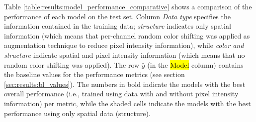 
\glsresetall
\graphicspath{{./Sections/Results/Resources/}}

Table \ref{table:results:model_performance_comparative} shows a comparison of the performance of each model on the test set. Column \textit{Data type} specifies the information contained in the training data; \textit{structure} indicates only spatial information (which means that per-channel random color shifting was applied as augmentation technique to reduce pixel intensity information), while \textit{color and structure} indicate spatial and pixel intensity information (which means that no random color shifting was applied). The row $\bar{y}$ (in the \hl{Model} column) contains the baseline values for the performance metrics (see section \ref{sec:results:bl_values}). The numbers in bold indicate the models with the best overall performance (i.e., trained using data with and without pixel intensity information) per metric, while the shaded cells indicate the models with the best performance using only spatial data (structure).

\setlength{\mylinewidth}{\linewidth-7pt}%
\setlength{\mylengtha}{0.17\mylinewidth-2\arraycolsep}%
\setlength{\mylengthb}{0.2\mylinewidth-2\arraycolsep}%
\setlength{\mylengthc}{0.1\mylinewidth-2\arraycolsep}%
\setlength{\mylengthd}{0.1\mylinewidth-2\arraycolsep}%
\setlength{\mylengthe}{0.1\mylinewidth-2\arraycolsep}%
\setlength{\mylengthf}{0.09\mylinewidth-2\arraycolsep}%
\setlength{\mylengthg}{0.1\mylinewidth-2\arraycolsep}%
\setlength{\mylengthh}{0.1\mylinewidth-2\arraycolsep}%

